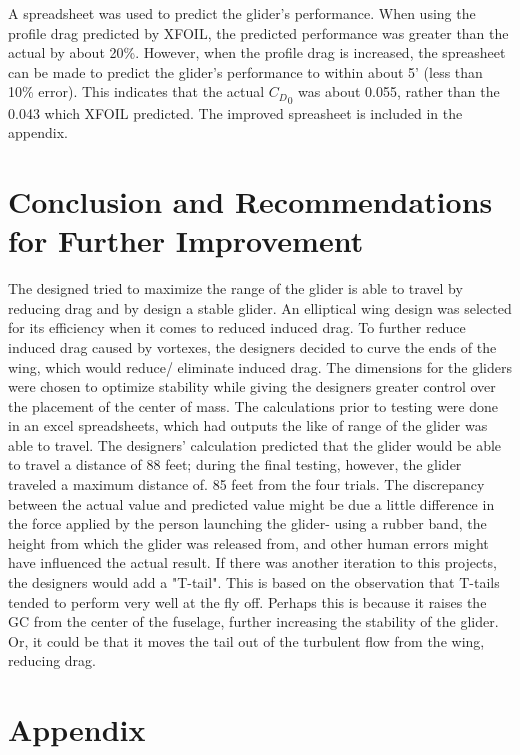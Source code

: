 \documentclass{article}
\begin{document}
A spreadsheet was used to predict the glider's performance. When using the profile drag predicted by XFOIL, the predicted performance was
greater than the actual by about 20\%. However, when the profile drag is increased, the spreasheet can be made to predict the glider's
performance to within about 5' (less than 10\% error). This indicates that the actual ${C_D}_0$ was about 0.055, rather than the 0.043 which XFOIL
predicted. The improved spreasheet is included in the appendix.

\section{Conclusion and Recommendations for Further Improvement}
The designed tried to maximize the range of the glider is able to travel by reducing drag and by design a stable glider. An elliptical wing design was selected for its efficiency when it comes to reduced induced drag. To further reduce induced drag caused by vortexes, the designers decided to curve the ends of the wing, which would reduce/ eliminate induced drag. The dimensions for the gliders were chosen to optimize stability while giving the designers greater control over the placement of the center of mass. The calculations prior to testing were done in an excel spreadsheets, which had outputs the like of range of the glider was able to travel. The designers’ calculation predicted that the glider would be able to travel a distance of 88 feet; during the final testing, however, the glider traveled a maximum distance of. 85 feet from the four trials. The discrepancy between the actual value and predicted value might be due a little difference in the force applied by the person launching the glider- using a rubber band, the height from which the glider was released
from, and other human errors might have influenced the actual result. If there was another iteration to this projects, the designers would add a "T-tail". This is based on the observation that T-tails tended to perform very well at the fly off. Perhaps this is because it raises the GC from the center of the fuselage, further increasing the stability of the glider. Or, it could be that it moves the tail out of the turbulent flow from the wing, reducing drag.

\section{Appendix}
\end{document}
